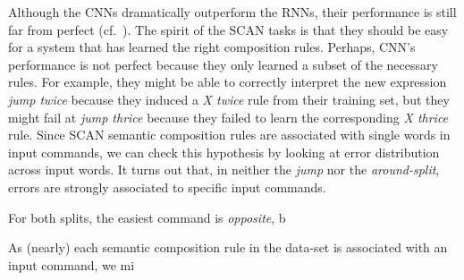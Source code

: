 Although the CNNs dramatically outperform the RNNs, their performance
is still far from perfect (cf.~\label{table:main results}). The spirit
of the SCAN tasks is that they should be easy for a system that has
learned the right composition rules. Perhaps, CNN's performance is not
perfect because they only learned a subset of the necessary rules. For
example, they might be able to correctly interpret the new expression
\emph{jump twice} because they induced a \emph{X twice} rule from
their training set, but they might fail at \emph{jump thrice} because
they failed to learn the corresponding \emph{X thrice} rule. Since
SCAN semantic composition rules are associated with single words in
input commands, we can check this hypothesis by looking at error
distribution across input words. It turns out that, in neither the
\emph{jump} nor the \emph{around-split}, errors are strongly
associated to specific input commands. 


For both splits, the easiest
command is \emph{opposite}, b


As (nearly) each semantic
composition rule in the data-set is associated with an input command, we mi

